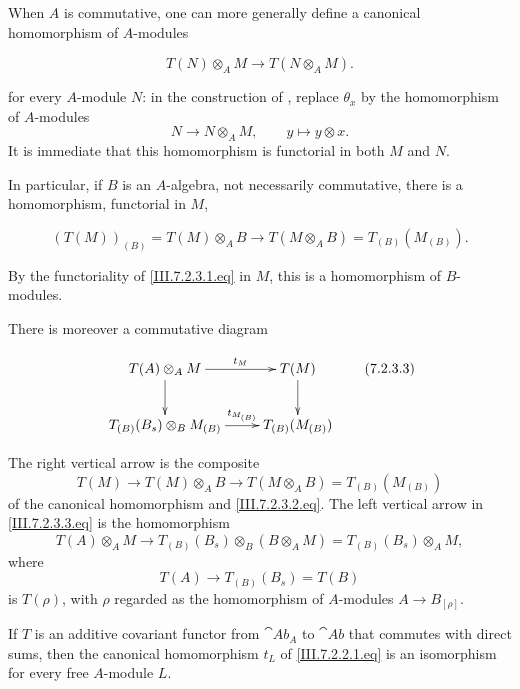 \begin{env}[7.2.3]
\label{III.7.2.3}
When $A$ is commutative, one can more generally define a
canonical homomorphism of $A$-modules
\begin{env}[7.2.3.1]
\label{III.7.2.3.1}
\[
  T(N)\otimes_A M
  \longrightarrow
  T(N\otimes_A M).
  \tag{7.2.3.1}\label{III.7.2.3.1.eq}
\]
\end{env}
for every $A$-module $N$: in the construction of
, replace $\theta_x$ by the homomorphism of
$A$-modules
\[
  N\longrightarrow N\otimes_A M,
  \qquad
  y\longmapsto y\otimes x.
\]
It is immediate that this homomorphism is functorial in both
$M$ and $N$.

In particular, if $B$ is an $A$-algebra, not necessarily
commutative, there is a homomorphism, functorial in $M$,
\begin{env}[7.2.3.2]
\label{III.7.2.3.2}
\[
  (T(M))_{(B)}
  =
  T(M)\otimes_A B
  \longrightarrow
  T(M\otimes_A B)
  =
  T_{(B)}(M_{(B)}).
  \tag{7.2.3.2}\label{III.7.2.3.2.eq}
\]
\end{env}
By the functoriality of \eqref{III.7.2.3.1.eq} in $M$, this is
a homomorphism of $B$-modules.

There is moreover a commutative diagram
\begin{env}[7.2.3.3]
\label{III.7.2.3.3}
\[
\xymatrix{
  T(A)\otimes_A M
    \ar[r]^-{t_M}\ar[d]
  & T(M)\ar[d]
  \\
  T_{(B)}(B_s)\otimes_B M_{(B)}
    \ar[r]^-{t_{M_{(B)}}}
  & T_{(B)}(M_{(B)})
}
\tag{7.2.3.3}\label{III.7.2.3.3.eq}
\]
\end{env}
The right vertical arrow is the composite
\[
  T(M)
  \longrightarrow
  T(M)\otimes_A B
  \longrightarrow
  T(M\otimes_A B)
  =
  T_{(B)}(M_{(B)})
\]
of the canonical homomorphism and
\eqref{III.7.2.3.2.eq}.  The left vertical arrow in
\eqref{III.7.2.3.3.eq} is the homomorphism
\[
  T(A)\otimes_A M
  \longrightarrow
  T_{(B)}(B_s)\otimes_B(B\otimes_A M)
  =
  T_{(B)}(B_s)\otimes_A M,
\]
where
\[
  T(A)\longrightarrow T_{(B)}(B_s)=T(B)
\]
is $T(\rho)$, with $\rho$ regarded as the homomorphism of
$A$-modules $A\to B_{[\rho]}$.
\end{env}

\begin{lemma}[7.2.4]
\label{III.7.2.4}
If $T$ is an additive covariant functor from $\cat{Ab}_A$ to
$\cat{Ab}$ that commutes with direct sums, then the canonical
homomorphism $t_L$ of \eqref{III.7.2.2.1.eq} is an isomorphism
for every free $A$-module $L$.
\end{lemma}

